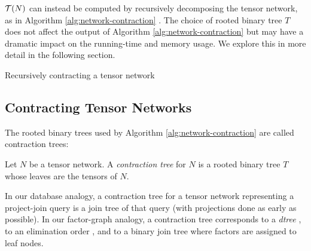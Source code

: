 $\mathcal{T}(N)$ can instead be computed by recursively decomposing the tensor network, as in Algorithm \ref{alg:network-contraction} \cite{EP14}. The choice of rooted binary tree $T$ does not affect the output of Algorithm \ref{alg:network-contraction} but may have a dramatic impact on the running-time and memory usage. We explore this in more detail in the following section.

\begin{algorithm*}[t]
    \label{alg:network-contraction}
    \caption{Recursively contracting a tensor network}
    
    \DontPrintSemicolon
\end{algorithm*}

\subsection{Contracting Tensor Networks}
The rooted binary trees used by Algorithm \ref{alg:network-contraction} are called contraction trees:
\begin{definition} \label{def:contraction-tree}
	Let $N$ be a tensor network. A \emph{contraction tree} for $N$ is a rooted binary tree $T$ whose leaves are the tensors of $N$. %
\end{definition}

In our database analogy, a contraction tree for a tensor network representing a project-join query is a join tree of that query (with projections done as early as possible). In our factor-graph analogy, a contraction tree corresponds to a \emph{dtree} \cite{darwiche01}, to an elimination order \cite{darwiche01b}, and to a binary join tree \cite{shenoy97} where factors are assigned to leaf nodes.

